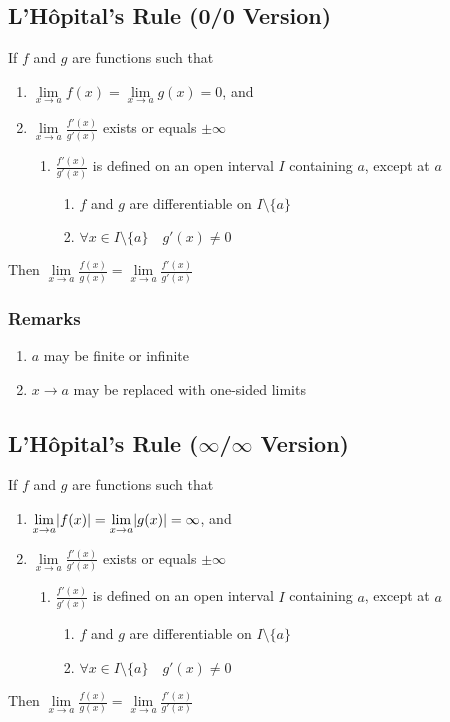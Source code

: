 \documentclass[../ma2002_notes.tex]{subfiles}
\begin{document}
\subsection{L'H\^{o}pital's Rule (0/0 Version)}
If \(f\) and \(g\) are functions such that
\begin{enumerate}
	\item\(\lim\limits_{x\to a}f(x)=\lim\limits_{x\to a}g(x)=0\), and
	\item\(\lim\limits_{x\to a}\frac{f'(x)}{g'(x)}\) exists or equals \(\pm\infty\)
	\begin{enumerate}
		\item\(\frac{f'(x)}{g'(x)}\) is defined on an open interval \(I\) containing \(a\), except at \(a\)
		\begin{enumerate}
			\item\(f\) and \(g\) are differentiable on \(I\setminus\{a\}\)
			\item\(\forall x\in I\setminus\{a\}\quad g'(x)\ne0\)
		\end{enumerate}
	\end{enumerate}
\end{enumerate}
Then \(\lim\limits_{x\to a}\frac{f(x)}{g(x)}=\lim\limits_{x\to a}\frac{f'(x)}{g'(x)}\)

\subsubsection{Remarks}
\begin{enumerate}
	\item\(a\) may be finite or infinite
	\item\(x\to a\) may be replaced with one-sided limits
\end{enumerate}

\subsection{L'H\^{o}pital's Rule ($\infty$/$\infty$ Version)}
If \(f\) and \(g\) are functions such that
\begin{enumerate}
	\item\(\lim\limits_{x\to a}\lvert f(x)\rvert=\lim\limits_{x\to a}\lvert g(x)\rvert=\infty\), and
	\item\(\lim\limits_{x\to a}\frac{f'(x)}{g'(x)}\) exists or equals \(\pm\infty\)
	\begin{enumerate}
		\item\(\frac{f'(x)}{g'(x)}\) is defined on an open interval \(I\) containing \(a\), except at \(a\)
		\begin{enumerate}
			\item\(f\) and \(g\) are differentiable on \(I\setminus\{a\}\)
			\item\(\forall x\in I\setminus\{a\}\quad g'(x)\ne0\)
		\end{enumerate}
	\end{enumerate}
\end{enumerate}
Then \(\lim\limits_{x\to a}\frac{f(x)}{g(x)}=\lim\limits_{x\to a}\frac{f'(x)}{g'(x)}\)
\end{document}
